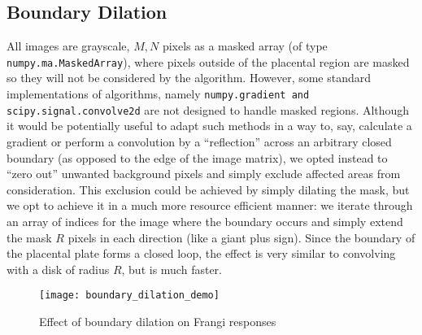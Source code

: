     \subsection{Boundary Dilation} \label{sec:boundary-dilation}
    
    All images are grayscale, $M,N$ pixels as a masked array (of type
    \texttt{numpy.ma.MaskedArray}), where pixels outside of the placental region are masked so they will not be considered by the algorithm. However, some standard
    implementations of algorithms, namely \texttt{numpy.gradient and scipy.signal.convolve2d} are not designed to handle masked regions. Although it would be potentially useful to adapt such methods in a way to, say, calculate a gradient or perform a convolution by a ``reflection'' across an arbitrary closed boundary (as opposed to the edge of the image matrix), we opted instead to ``zero out'' unwanted background pixels and simply exclude affected areas from consideration. This exclusion could be achieved by
    simply dilating the mask, but we opt to achieve it in a much more resource efficient manner: we iterate through an array of indices for the image where the boundary occurs and simply extend the mask $R$ pixels in each direction (like a giant plus sign). Since the boundary of the placental plate forms a closed loop, the effect is very similar to convolving with a disk of radius $R$, but is much faster.
    
    \begin{figure} 
        \texttt{[image: boundary\_dilation\_demo]}
        \caption{Effect of boundary dilation on Frangi responses}
        \label{fig:boundary-demo}
    \end{figure}
    

